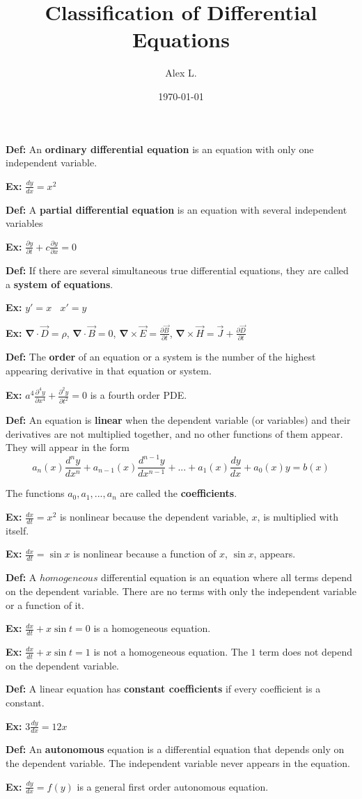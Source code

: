 \documentclass{article}
\title{Classification of Differential Equations}
\author{Alex L.}
\date{\today}
\begin{document}
\maketitle

\textbf{Def:} An \textbf{ordinary differential equation} is an equation with only one independent variable.

\textbf{Ex:} $\frac{dy}{dx} = x^2$

\textbf{Def:} A \textbf{partial differential equation} is an equation with several independent variables

\textbf{Ex:} $\frac{\partial y}{\partial t} + c\frac{\partial y}{\partial x} = 0$

\textbf{Def:} If there are several simultaneous true differential equations, they are called a \textbf{system of equations}.

\textbf{Ex:} $y' = x \ \ \ \ x' = y$

\textbf{Ex:} $\mathbf{\nabla} \cdot \vec{D} = \rho$, $\mathbf{\nabla} \cdot \vec{B} = 0$, $\mathbf{\nabla} \times \vec{E} = \frac{\partial \vec{B}}{\partial t}$, $\mathbf{\nabla} \times \vec{H} = \vec{J} + \frac{\partial \vec{D}}{\partial t}$

\textbf{Def:} The \textbf{order} of an equation or a system is the number of the highest appearing derivative in that equation or system.

\textbf{Ex:} $a^4 \frac{\partial^4y}{\partial x^4} + \frac{\partial^2 y}{\partial t^2} = 0$ is a fourth order PDE.

\textbf{Def:} An equation is \textbf{linear} when the dependent variable (or variables) and their derivatives are not multiplied together, and no other functions of them appear. They will appear in the form $$a_n(x)\frac{d^n y}{dx^n} + a_{n-1}(x)\frac{d^{n-1}y}{dx^{n-1}}+...+a_1(x)\frac{dy}{dx} + a_0(x)y = b(x)$$

The functions $a_0, a_1, ... ,a_n$ are called the \textbf{coefficients}.

\textbf{Ex:} $\frac{dx}{dt} = x^2$ is nonlinear because the dependent variable, $x$, is multiplied with itself. 

\textbf{Ex:} $\frac{dx}{dt} = \sin x$ is nonlinear because a function of $x$, $\sin x$, appears.

\textbf{Def:} A $homogeneous$ differential equation is an equation where all terms depend on the dependent variable. There are no terms with only the independent variable or a function of it.

\textbf{Ex:} $\frac{dx}{dt} + x\sin t = 0$ is a homogeneous equation.

\textbf{Ex:} $\frac{dx}{dt} + x\sin t = 1$ is not a homogeneous equation. The $1$ term does not depend on the dependent variable.

\textbf{Def:} A linear equation has \textbf{constant coefficients} if every coefficient is a constant. 

\textbf{Ex:} $3\frac{dy}{dx} = 12x$

\textbf{Def:} An \textbf{autonomous} equation is a differential equation that depends only on the dependent variable. The independent variable never appears in the equation.

\textbf{Ex:} $\frac{dy}{dx} = f(y)$ is a general first order autonomous equation.
\end{document}
